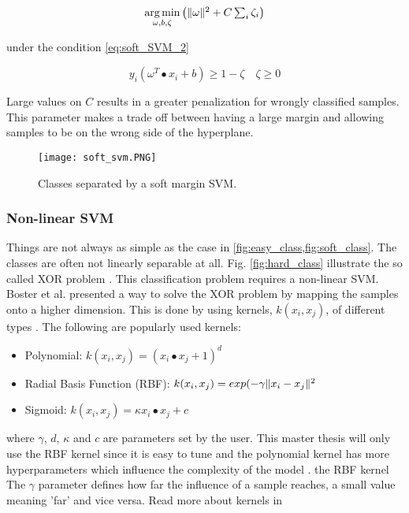 \begin{equation} \label{eq:soft_SVM}
\underset{\omega,b,\zeta}{\mathrm{\operatorname{arg\,min}}} 
\begin{pmatrix}
\lVert\omega\rVert^2 + C\sum_{i}\zeta_i
\end{pmatrix}
\end{equation} 

under the condition \cref{eq:soft_SVM_2}

\begin{equation} \label{eq:soft_SVM_2}
y_i(\omega^T \bullet x_i + b) \geq 1 - \zeta \quad \zeta \geq 0
\end{equation} 

Large values on $C$ results in a greater penalization for wrongly classified samples. This parameter makes a trade off between having a large margin and allowing samples to be on the wrong side of the hyperplane.    

\FloatBarrier
\begin{figure}[!h]
	\centering
	\texttt{[image: soft\_svm.PNG]}
	\caption{Classes separated by a soft margin SVM.
		\label{fig:soft_class}}
\end{figure} 
\FloatBarrier

\subsubsection{Non-linear SVM}

Things are not always as simple as the case in \cref{fig:easy_class,fig:soft_class}. The classes are often not linearly separable at all. Fig. \ref{fig:hard_class} illustrate the so called XOR problem \cite{yu2012svm}. This classification problem requires a non-linear SVM. Boster et al. \cite{boser1992training} presented a way to solve the XOR problem by mapping the samples onto a higher dimension. This is done by using kernels, $k(x_i,x_j)$, of different types \cite{yu2012svm}. The following are popularly used kernels: 

\begin{itemize}
	\item Polynomial: $k(x_i,x_j) =(x_i \bullet  x_j + 1)^d $
	\item Radial Basis Function (RBF): $k(x_i,x_j) = exp(-\gamma \lVert x_i - x_j\rVert^2 $
	\item Sigmoid: $k(x_i,x_j) =\kappa x_i \bullet  x_j + c$
\end{itemize}

where $\gamma$, $d$, $\kappa$ and $c$ are parameters set by the user. This master thesis will only use the RBF kernel since it is easy to tune and the polynomial kernel has more hyperparameters which influence the complexity of the model \cite{svm_guide}. 
the RBF kernel The $\gamma$ parameter defines how far the influence of a sample reaches, a small value meaning 'far' and vice versa. Read more about kernels in \cite{vert2004primer} 

